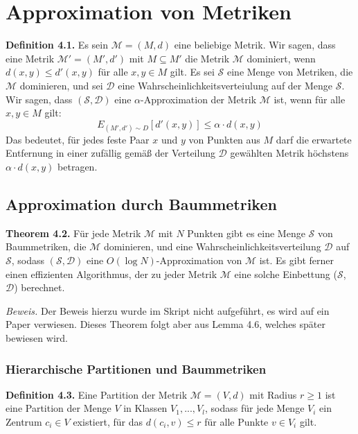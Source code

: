 \chapter{Approximation von Metriken}

\textbf{Definition 4.1.} Es sein $\mathcal{M} = (M, d)$ eine beliebige Metrik. Wir sagen, dass eine Metrik $\mathcal{M'} = (M', d')$ mit $M \subseteq M'$ die Metrik $\mathcal{M}$ dominiert, wenn $d(x, y) \le d'(x, y)$ für alle $x,y \in M$ gilt. Es sei $\mathcal{S}$ eine Menge von Metriken, die $\mathcal{M}$ dominieren, und sei $\mathcal{D}$ eine Wahrscheinlichkeitsverteiulung auf der Menge $\mathcal{S}$. Wir sagen, dass $(\mathcal{S}, \mathcal{D})$ eine $\alpha$-Approximation der Metrik $\mathcal{M}$ ist, wenn für alle $x, y \in M$ gilt:
$$E_{(M', d')\sim D} [d'(x, y)] \le \alpha \cdot d(x, y)$$
Das bedeutet, für jedes feste Paar $x$ und $y$ von Punkten aus $M$ darf die erwartete Entfernung in einer zufällig gemäß der Verteilung $\mathcal{D}$ gewählten Metrik höchstens $\alpha \cdot d(x, y)$ betragen.

\section{Approximation durch Baummetriken}

\textbf{Theorem 4.2.} Für jede Metrik $\mathcal{M}$ mit $N$ Punkten gibt es eine Menge $\mathcal{S}$ von Baummetriken, die $\mathcal{M}$ dominieren, und eine Wahrscheinlichkeitsverteilung $\mathcal{D}$ auf $\mathcal{S}$, sodass $(\mathcal{S}, \mathcal{D})$ eine $O(\log N)$-Approximation von $\mathcal{M}$ ist. Es gibt ferner einen effizienten Algorithmus, der zu jeder Metrik $\mathcal{M}$ eine solche Einbettung ($\mathcal{S}$, $\mathcal{D}$) berechnet.

\textit{Beweis.} Der Beweis hierzu wurde im Skript nicht aufgeführt, es wird auf ein Paper verwiesen. Dieses Theorem folgt aber aus Lemma 4.6, welches später bewiesen wird.

\subsection{Hierarchische Partitionen und Baummetriken}

\textbf{Definition 4.3.} Eine Partition der Metrik $\mathcal{M} = (V, d)$ mit Radius $r \ge 1$ ist eine Partition der Menge $V$ in Klassen $V_{1}, ..., V_{l}$, sodass für jede Menge $V_{i}$ ein Zentrum $c_{i} \in V$ existiert, für das $d(c_{i}, v) \le r$ für alle Punkte $v \in V_{i}$ gilt.


